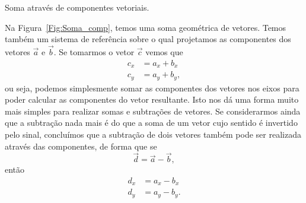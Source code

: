 \begin{marginfigure}[1cm]
\centering
{}
\caption{Soma através de componentes vetoriais.\label{Fig:Soma_comp}}
\end{marginfigure}

Na Figura~\ref{Fig:Soma_comp}, temos uma soma geométrica de vetores. Temos também um sistema de referência sobre o qual projetamos as componentes dos vetores $\vec{a}$ e $\vec{b}$. Se tomarmos o vetor $\vec{c}$ vemos que
\begin{align}
  c_x &= a_x + b_x \\
  c_y &= a_y + b_y,
\end{align}
%
ou seja, podemos simplesmente somar as componentes dos vetores nos eixos para poder calcular as componentes do vetor resultante. Isto nos dá uma forma muito mais simples para realizar somas e subtrações de vetores. Se considerarmos ainda que a subtração nada mais é do que a soma de um vetor cujo sentido é invertido pelo sinal, concluímos que a subtração de dois vetores também pode ser realizada através das componentes, de forma que se
\begin{equation}
    \vec{d} = \vec{a} - \vec{b},
\end{equation}
%
então
\begin{align}
    d_x &= a_x - b_x \\
    d_y &= a_y - b_y.
\end{align}

